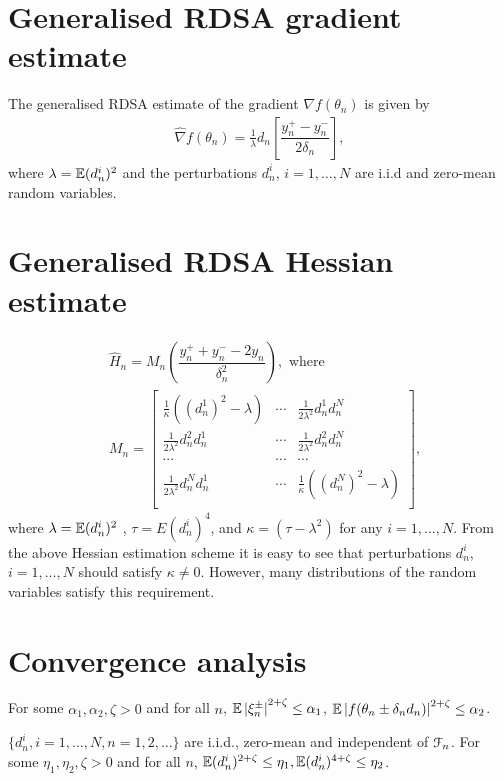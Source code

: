 \section{Generalised RDSA gradient estimate}
The generalised RDSA estimate of the gradient $\nabla f(\theta_n)$ is given by
\begin{align}
\label{eq:grad-gen}
\widehat\nabla f(\theta_n) = \frac1{\lambda} d_n \left[ \dfrac{y_n^+ - y_n^-}{2\delta_n}\right],
\end{align}
where $\lambda = \mathbb{E}(d_n^i)^2 $ and the perturbations $d_n^i$, $i=1,\ldots,N$ are i.i.d and zero-mean random variables. 

\section{Generalised RDSA Hessian estimate}
\begin{align}
\label{eq:2rdsa-estimate-gen}
&\widehat H_n = M_n \left(\dfrac{y_n^+ + y_n^- - 2 y_n}{\delta_n^2}\right), \text{ where }\\
& M_n =
\left[
\begin{array}{ccc}
\frac{1}{\kappa}\left((d_n^1)^2\!-\lambda\right) & \cdots & \frac{1}{2 \lambda^2}d_n^1 d_n^N\\
\frac{1}{2 \lambda^2}d_n^2 d_n^1  &  \cdots & \frac{1}{2 \lambda^2}d_n^2 d_n^N\\
\cdots&\cdots&\cdots\\
\frac{1}{2 \lambda^2}d_n^N d_n^1 & \cdots &  \frac{1}{\kappa}\left((d_n^N)^2-\lambda\right) \\
\end{array}
\right],\nonumber
\end{align}
where $\lambda = \mathbb{E}(d_n^i)^2 $ , $\tau = E (d_n^i)^4$, and $\kappa = \left(\tau - \lambda^2\right)$ for any $i=1,\ldots,N$.
From the above Hessian estimation scheme it is easy to see that perturbations $d_n^i$, $i=1,\ldots,N$ should satisfy  $\kappa \neq 0$. However, many distributions of the random variables satisfy this requirement. 

\section{Convergence analysis}
\label{sec:2rdsa-gen-results}
\begin{pvn}
\item For some $\alpha_1, \alpha_2,\zeta >0$ and for all $n$, 
$\mathbb{E} \left|\xi_n^{\pm}\right|^{2+\zeta} \le \alpha_1$, $\mathbb{E} \left|f(\theta_n\pm \delta_n d_n)\right|^{2+\zeta} \le \alpha_2$. 
\item $\{d_n^i, i=1,\ldots,N, n=1,2,\ldots\}$ are i.i.d., zero-mean and independent of $\mathcal{F}_n$. For some $\eta_1,\eta_2,\zeta >0$ and for all $n$, $\mathbb{E}(d_n^i)^{2+\zeta} \le \eta_1,\mathbb{E}(d_n^i)^{4+\zeta} \le \eta_2$.
\end{pvn}


